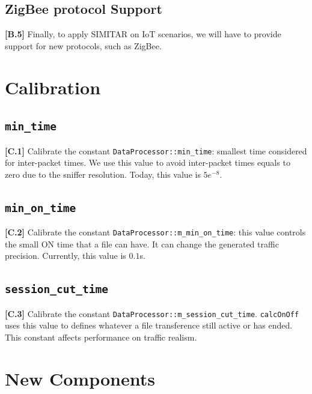 \subsection{ZigBee protocol Support}

\textbf{[B.5]} Finally, to apply SIMITAR on IoT scenarios, we will have to provide support for new protocols, such as ZigBee\cite{zigbee}.



\section{Calibration}


\subsection{ \texttt{min\_time}}

\textbf{[C.1]} Calibrate the constant \texttt{DataProcessor::min\_time}: smallest time considered for inter-packet times. We use this value to avoid inter-packet times equals to zero due to the sniffer resolution. Today, this value is $5e^{-8}$.

\subsection{\texttt{min\_on\_time}}

\textbf{[C.2]} Calibrate the constant \texttt{DataProcessor::m\_min\_on\_time}: this value controls the small ON time that a file can have. It can change the generated traffic precision. Currently, this value is $0.1$s. 

\subsection{\texttt{session\_cut\_time}}

\textbf{[C.3]} Calibrate the constant \texttt{DataProcessor::m\_session\_cut\_time}. \texttt{calcOnOff} uses this value to defines whatever a file transference still active or has ended.  This constant affects performance on traffic realism. 



\section{New Components}



